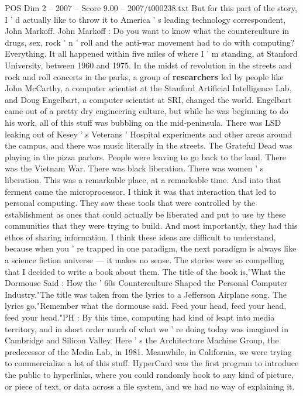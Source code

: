 \begin{textsample}{POS Dim 2 – 2007 – Score 9.00 – 2007/t000238.txt}
But for this part of the story, I ' d actually like to throw it to America ' s leading technology correspondent, John Markoff.
John Markoff : Do you want to know what the counterculture in drugs, sex, rock ' n ' roll and the anti-war movement had to do with computing?
Everything.
It all happened within five miles of where I ' m standing, at Stanford University, between 1960 and 1975.
In the midst of revolution in the streets and rock and roll concerts in the parks, a group of \textbf{researchers} led by people like John McCarthy, a computer scientist at the Stanford Artificial Intelligence Lab, and Doug Engelbart, a computer scientist at SRI, changed the world.
Engelbart came out of a pretty dry engineering culture, but while he was beginning to do his work, all of this stuff was bubbling on the mid-peninsula.
There was LSD leaking out of Kesey ' s Veterans ' Hospital experiments and other areas around the campus, and there was music literally in the streets.
The Grateful Dead was playing in the pizza parlors.
People were leaving to go back to the land.
There was the Vietnam War.
There was black liberation.
There was women ' s liberation.
This was a remarkable place, at a remarkable time.
And into that ferment came the microprocessor.
I think it was that interaction that led to personal computing.
They saw these tools that were controlled by the establishment as ones that could actually be liberated and put to use by these communities that they were trying to build.
And most importantly, they had this ethos of sharing information.
I think these ideas are difficult to understand, because when you ' re trapped in one paradigm, the next paradigm is always like a science fiction universe — it makes no sense.
The stories were so compelling that I decided to write a book about them.
The title of the book is,"What the Dormouse Said : How the ' 60s Counterculture Shaped the Personal Computer Industry."The title was taken from the lyrics to a Jefferson Airplane song.
The lyrics go,"Remember what the dormouse said.
Feed your head, feed your head, feed your head."PH : By this time, computing had kind of leapt into media territory, and in short order much of what we ' re doing today was imagined in Cambridge and Silicon Valley.
Here ' s the Architecture Machine Group, the predecessor of the Media Lab, in 1981.
Meanwhile, in California, we were trying to commercialize a lot of this stuff.
HyperCard was the first program to introduce the public to hyperlinks, where you could randomly hook to any kind of picture, or piece of text, or data across a file system, and we had no way of explaining it.

\end{textsample}

